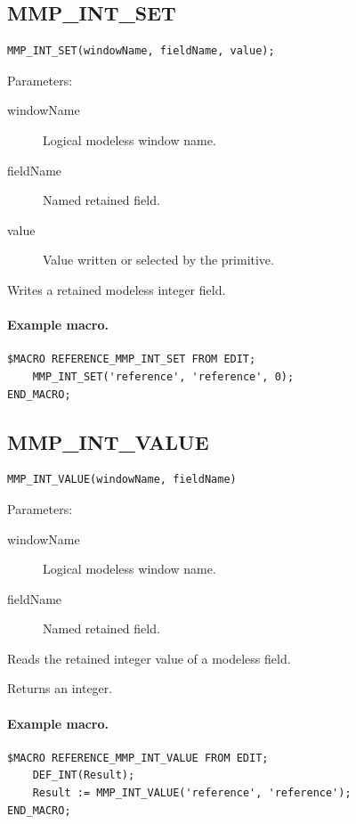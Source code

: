 \documentclass[a4paper,10pt,twoside,openany]{book}
\newenvironment{mrmacextension}{\begin{changebar}}{\end{changebar}}
\begin{document}
\begin{mrmacextension}
\label{prim:procedure-mmp-int-set}
\subsection*{MMP\_INT\_SET}
\begin{verbatim}
MMP_INT_SET(windowName, fieldName, value);
\end{verbatim}
Parameters:
\begin{description}
\item[windowName] Logical modeless window name.
\item[fieldName] Named retained field.
\item[value] Value written or selected by the primitive.
\end{description}

Writes a retained modeless integer field.

\paragraph{Example macro.}
\begin{verbatim}
$MACRO REFERENCE_MMP_INT_SET FROM EDIT;
    MMP_INT_SET('reference', 'reference', 0);
END_MACRO;
\end{verbatim}
\end{mrmacextension}

\begin{mrmacextension}
\label{prim:intrinsic-mmp-int-value}
\subsection*{MMP\_INT\_VALUE}
\begin{verbatim}
MMP_INT_VALUE(windowName, fieldName)
\end{verbatim}
Parameters:
\begin{description}
\item[windowName] Logical modeless window name.
\item[fieldName] Named retained field.
\end{description}

Reads the retained integer value of a modeless field.

Returns an integer.

\paragraph{Example macro.}
\begin{verbatim}
$MACRO REFERENCE_MMP_INT_VALUE FROM EDIT;
    DEF_INT(Result);
    Result := MMP_INT_VALUE('reference', 'reference');
END_MACRO;
\end{verbatim}
\end{mrmacextension}
\end{document}
